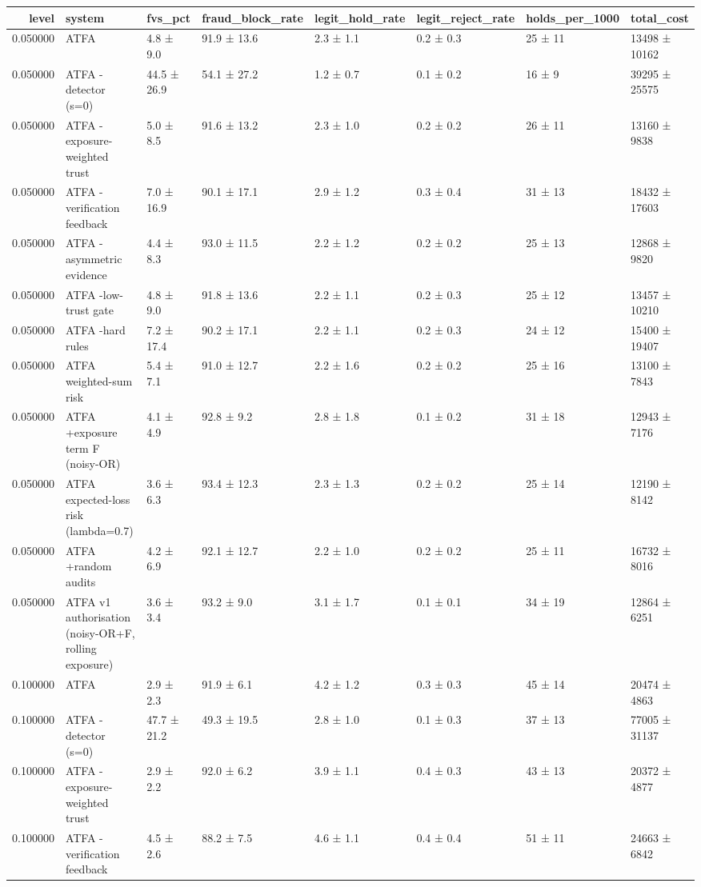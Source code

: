 \begin{tabular}{rlllllll}
\toprule
level & system & fvs\_pct & fraud\_block\_rate & legit\_hold\_rate & legit\_reject\_rate & holds\_per\_1000 & total\_cost \\
\midrule
0.050000 & ATFA & 4.8 ± 9.0 & 91.9 ± 13.6 & 2.3 ± 1.1 & 0.2 ± 0.3 & 25 ± 11 & 13498 ± 10162 \\
0.050000 & ATFA -detector (s=0) & 44.5 ± 26.9 & 54.1 ± 27.2 & 1.2 ± 0.7 & 0.1 ± 0.2 & 16 ± 9 & 39295 ± 25575 \\
0.050000 & ATFA -exposure-weighted trust & 5.0 ± 8.5 & 91.6 ± 13.2 & 2.3 ± 1.0 & 0.2 ± 0.2 & 26 ± 11 & 13160 ± 9838 \\
0.050000 & ATFA -verification feedback & 7.0 ± 16.9 & 90.1 ± 17.1 & 2.9 ± 1.2 & 0.3 ± 0.4 & 31 ± 13 & 18432 ± 17603 \\
0.050000 & ATFA -asymmetric evidence & 4.4 ± 8.3 & 93.0 ± 11.5 & 2.2 ± 1.2 & 0.2 ± 0.2 & 25 ± 13 & 12868 ± 9820 \\
0.050000 & ATFA -low-trust gate & 4.8 ± 9.0 & 91.8 ± 13.6 & 2.2 ± 1.1 & 0.2 ± 0.3 & 25 ± 12 & 13457 ± 10210 \\
0.050000 & ATFA -hard rules & 7.2 ± 17.4 & 90.2 ± 17.1 & 2.2 ± 1.1 & 0.2 ± 0.3 & 24 ± 12 & 15400 ± 19407 \\
0.050000 & ATFA weighted-sum risk & 5.4 ± 7.1 & 91.0 ± 12.7 & 2.2 ± 1.6 & 0.2 ± 0.2 & 25 ± 16 & 13100 ± 7843 \\
0.050000 & ATFA +exposure term F (noisy-OR) & 4.1 ± 4.9 & 92.8 ± 9.2 & 2.8 ± 1.8 & 0.1 ± 0.2 & 31 ± 18 & 12943 ± 7176 \\
0.050000 & ATFA expected-loss risk (lambda=0.7) & 3.6 ± 6.3 & 93.4 ± 12.3 & 2.3 ± 1.3 & 0.2 ± 0.2 & 25 ± 14 & 12190 ± 8142 \\
0.050000 & ATFA +random audits & 4.2 ± 6.9 & 92.1 ± 12.7 & 2.2 ± 1.0 & 0.2 ± 0.2 & 25 ± 11 & 16732 ± 8016 \\
0.050000 & ATFA v1 authorisation (noisy-OR+F, rolling exposure) & 3.6 ± 3.4 & 93.2 ± 9.0 & 3.1 ± 1.7 & 0.1 ± 0.1 & 34 ± 19 & 12864 ± 6251 \\
0.100000 & ATFA & 2.9 ± 2.3 & 91.9 ± 6.1 & 4.2 ± 1.2 & 0.3 ± 0.3 & 45 ± 14 & 20474 ± 4863 \\
0.100000 & ATFA -detector (s=0) & 47.7 ± 21.2 & 49.3 ± 19.5 & 2.8 ± 1.0 & 0.1 ± 0.3 & 37 ± 13 & 77005 ± 31137 \\
0.100000 & ATFA -exposure-weighted trust & 2.9 ± 2.2 & 92.0 ± 6.2 & 3.9 ± 1.1 & 0.4 ± 0.3 & 43 ± 13 & 20372 ± 4877 \\
0.100000 & ATFA -verification feedback & 4.5 ± 2.6 & 88.2 ± 7.5 & 4.6 ± 1.1 & 0.4 ± 0.4 & 51 ± 11 & 24663 ± 6842 \\

\end{tabular}
